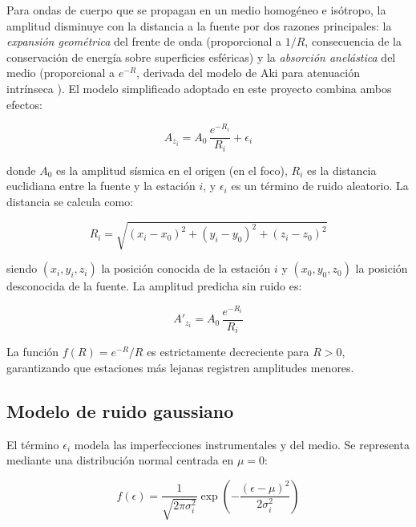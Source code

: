 \documentclass[12pt, a4paper]{article}
\begin{document}
Para ondas de cuerpo que se propagan en un medio homogéneo e isótropo,
la amplitud disminuye con la distancia a la fuente por dos razones
principales: la \textit{expansión geométrica} del frente de onda
(proporcional a $1/R$, consecuencia de la conservación de energía
sobre superficies esféricas) y la \textit{absorción anelástica} del
medio (proporcional a $e^{-R}$, derivada del modelo de Aki para
atenuación intrínseca \cite{aki1980attenuation}). El modelo
simplificado adoptado en este proyecto combina ambos efectos:

\begin{equation}
    A_{z_i} = A_0 \, \frac{e^{-R_i}}{R_i} + \epsilon_i
    \label{eq:modelo}
\end{equation}

donde $A_0$ es la amplitud sísmica en el origen (en el foco), $R_i$ es
la distancia euclidiana entre la fuente y la estación $i$, y
$\epsilon_i$ es un término de ruido aleatorio. La distancia se calcula
como:

\begin{equation}
    R_i = \sqrt{(x_i - x_0)^2 + (y_i - y_0)^2 + (z_i - z_0)^2}
    \label{eq:distancia}
\end{equation}

siendo $(x_i, y_i, z_i)$ la posición conocida de la estación $i$ y
$(x_0, y_0, z_0)$ la posición desconocida de la fuente. La amplitud
predicha sin ruido es:

\begin{equation}
    A'_{z_i} = A_0 \, \frac{e^{-R_i}}{R_i}
    \label{eq:predicha}
\end{equation}

La función $f(R) = e^{-R}/R$ es estrictamente decreciente para $R > 0$,
garantizando que estaciones más lejanas registren amplitudes menores.

\subsection{Modelo de ruido gaussiano}

El término $\epsilon_i$ modela las imperfecciones instrumentales y del
medio. Se representa mediante una distribución normal centrada en
$\mu = 0$:

\begin{equation}
    f(\epsilon) = \frac{1}{\sqrt{2\pi\sigma_i^2}}
    \exp\!\left(-\frac{(\epsilon - \mu)^2}{2\sigma_i^2}\right)
    \label{eq:ruido}
\end{equation}
\end{document}
